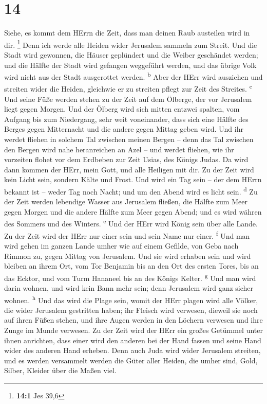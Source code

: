 \hypertarget{section-13}{%
\section{14}\label{section-13}}

 Siehe, es kommt dem HErrn die Zeit, dass man deinen Raub
austeilen wird in dir. \footnote{\textbf{14:1} Jes 39,6} 
Denn ich werde alle Heiden wider Jerusalem sammeln zum Streit. Und die
Stadt wird gewonnen, die Häuser geplündert und die Weiber geschändet
werden; und die Hälfte der Stadt wird gefangen weggeführt werden, und
das übrige Volk wird nicht aus der Stadt ausgerottet werden.
\textsuperscript{b}  Aber der HErr wird ausziehen und
streiten wider die Heiden, gleichwie er zu streiten pflegt zur Zeit des
Streites. \textsuperscript{c}  Und seine Füße werden
stehen zu der Zeit auf dem Ölberge, der vor Jerusalem liegt gegen
Morgen. Und der Ölberg wird sich mitten entzwei spalten, vom Aufgang bis
zum Niedergang, sehr weit voneinander, dass sich eine Hälfte des Berges
gegen Mitternacht und die andere gegen Mittag geben wird. 
Und ihr werdet fliehen in solchem Tal zwischen meinen Bergen -- denn das
Tal zwischen den Bergen wird nahe heranreichen an Azel -- und werdet
fliehen, wie ihr vorzeiten flohet vor dem Erdbeben zur Zeit Usias, des
Königs Judas. Da wird dann kommen der HErr, mein Gott, und alle Heiligen
mit dir.  Zu der Zeit wird kein Licht sein, sondern Kälte
und Frost.  Und wird ein Tag sein -- der dem HErrn bekannt
ist -- weder Tag noch Nacht; und um den Abend wird es licht sein.
\textsuperscript{d}  Zu der Zeit werden lebendige Wasser
aus Jerusalem fließen, die Hälfte zum Meer gegen Morgen und die andere
Hälfte zum Meer gegen Abend; und es wird währen des Sommers und des
Winters. \textsuperscript{e}  Und der HErr wird König sein
über alle Lande. Zu der Zeit wird der HErr nur einer sein und sein Name
nur einer. \textsuperscript{f}  Und man wird gehen im
ganzen Lande umher wie auf einem Gefilde, von Geba nach Rimmon zu, gegen
Mittag von Jerusalem. Und sie wird erhaben sein und wird bleiben an
ihrem Ort, vom Tor Benjamin bis an den Ort des ersten Tores, bis an das
Ecktor, und vom Turm Hananeel bis an des Königs Kelter.
\textsuperscript{g}  Und man wird darin wohnen, und wird
kein Bann mehr sein; denn Jerusalem wird ganz sicher wohnen.
\textsuperscript{h}  Und das wird die Plage sein, womit
der HErr plagen wird alle Völker, die wider Jerusalem gestritten haben;
ihr Fleisch wird verwesen, dieweil sie noch auf ihren Füßen stehen, und
ihre Augen werden in den Löchern verwesen und ihre Zunge im Munde
verwesen.  Zu der Zeit wird der HErr ein großes Getümmel
unter ihnen anrichten, dass einer wird den anderen bei der Hand fassen
und seine Hand wider des anderen Hand erheben.  Denn auch
Juda wird wider Jerusalem streiten, und es werden versammelt werden die
Güter aller Heiden, die umher sind, Gold, Silber, Kleider über die Maßen
viel.

